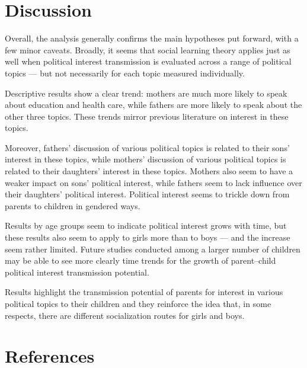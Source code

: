 \documentclass[
  letterpaper,
  DIV=11,
  numbers=noendperiod]{scrreprt}
\begin{document}
\hypertarget{discussion-1}{%
\section{Discussion}\label{discussion-1}}

Overall, the analysis generally confirms the main hypotheses put
forward, with a few minor caveats. Broadly, it seems that social
learning theory applies just as well when political interest
transmission is evaluated across a range of political topics --- but not
necessarily for each topic measured individually.

Descriptive results show a clear trend: mothers are much more likely to
speak about education and health care, while fathers are more likely to
speak about the other three topics. These trends mirror previous
literature on interest in these topics.

Moreover, fathers' discussion of various political topics is related to
their sons' interest in these topics, while mothers' discussion of
various political topics is related to their daughters' interest in
these topics. Mothers also seem to have a weaker impact on sons'
political interest, while fathers seem to lack influence over their
daughters' political interest. Political interest seems to trickle down
from parents to children in gendered ways.

Results by age groups seem to indicate political interest grows with
time, but these results also seem to apply to girls more than to boys
--- and the increase seem rather limited. Future studies conducted among
a larger number of children may be able to see more clearly time trends
for the growth of parent--child political interest transmission
potential.

Results highlight the transmission potential of parents for interest in
various political topics to their children and they reinforce the idea
that, in some respects, there are different socialization routes for
girls and boys.

\hypertarget{references-3}{%
\section{References}\label{references-3}}
\end{document}
